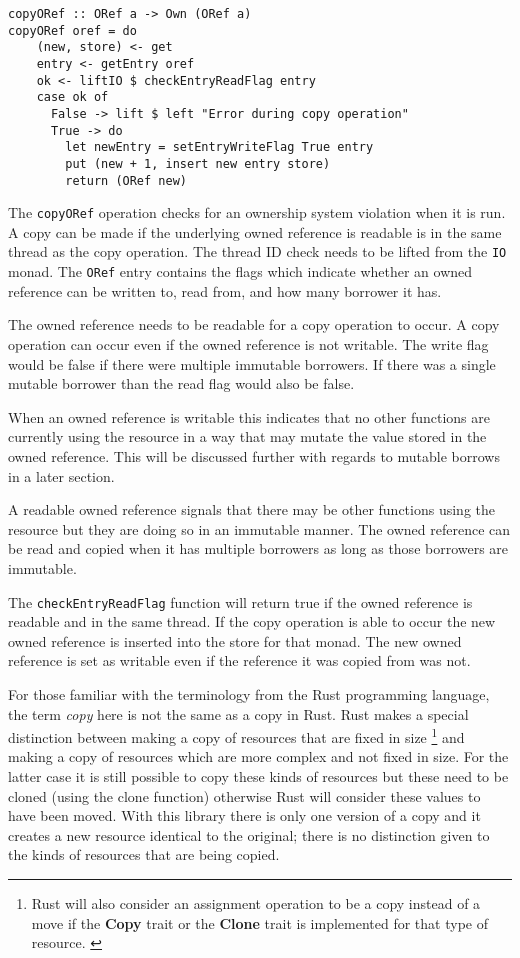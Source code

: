 \documentclass[onehalf,11pt]{beavtex}
\begin{document}
\begin{verbatim}
copyORef :: ORef a -> Own (ORef a)
copyORef oref = do
    (new, store) <- get
    entry <- getEntry oref
    ok <- liftIO $ checkEntryReadFlag entry
    case ok of
      False -> lift $ left "Error during copy operation"
      True -> do
        let newEntry = setEntryWriteFlag True entry
        put (new + 1, insert new entry store)
        return (ORef new)
\end{verbatim}

The \texttt{copyORef} operation checks for an ownership system violation when
it is run.  A copy can be made if the underlying owned reference is readable
is in the same thread as the copy operation.
The thread ID check needs to be lifted from the \texttt{IO} monad.
The \texttt{ORef} entry contains the flags which indicate whether an owned
reference can be written to, read from, and how many borrower it has.

The owned reference needs to be readable for a copy operation to occur.
A copy operation can occur even if the owned reference is not writable.
The write flag would be false if there were multiple immutable borrowers. If
there was a single mutable borrower than the read flag would also be false.

When an owned reference is writable this indicates that no other functions
are currently using the resource in a way that may mutate the value stored
in the owned reference.
This will be discussed further with regards to mutable borrows in a later
section.

A readable owned reference signals that there may be other functions using the
resource but they are doing so in an immutable manner. The owned reference can
be read and copied when it has multiple borrowers as long as those borrowers are
immutable.

The \texttt{checkEntryReadFlag} function will return true if the owned reference is
readable and in the same thread.
If the copy operation is able to occur the new owned reference is inserted into
the store for that monad. The new owned reference is set as writable even if
the reference it was copied from was not. %

For those familiar with the terminology from the Rust programming language, the
term \textit{copy} here is not the same as a copy in Rust. Rust makes a special
distinction between making a copy of resources that are fixed in size
\footnote{Rust will also consider an assignment operation to be a copy instead
  of a move if the \textbf{Copy} trait or the \textbf{Clone} trait is
  implemented for that type of resource. \cite{rust_book_traits}
  \cite{rust_docs_clone_trait}}
and making a copy of resources which are more complex and not fixed in size.
For the latter case it is still possible to copy these kinds of resources but these
need to be cloned (using the clone function) otherwise Rust will consider these
values to have been moved. \cite{rust_book_ownership}
With this library there is only one version of a copy and it creates a new
resource identical to the original; there is no distinction given to the kinds
of resources that are being copied.
\end{document}
